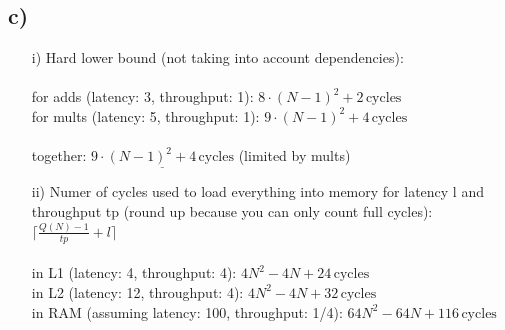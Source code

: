 \documentclass[11pt]{article}
\newcommand{\unit}[1]{\ensuremath{\, \mathrm{#1}}}			%
\begin{document}
		\subsection*{c)}
			\begin{itemize}
				\item[i)] Hard lower bound (not taking into account dependencies): \\\\
				for adds (latency: 3, throughput: 1): $8 \cdot (N-1)^2 + 2 \unit{cycles}$\\
				for mults (latency: 5, throughput: 1): $9 \cdot (N-1)^2 + 4 \unit{cycles}$ \\\\
				together: $\underline{9 \cdot (N-1)^2 + 4 \unit{cycles}}$ (limited by mults)
				\item[ii)] Numer of cycles used to load everything into memory for latency l and throughput tp (round up because you can only count full cycles):
				$\lceil \frac{Q(N) - 1}{tp} + l \rceil$\\\\
				in L1 (latency: 4, throughput: 4): $4 N^2 - 4 N + 24 \unit{cycles}$\\
				in L2 (latency: 12, throughput: 4): $4 N^2 - 4 N + 32 \unit{cycles}$\\
				in RAM (assuming latency: 100, throughput: 1/4): $64 N^2 - 64 N + 116 \unit{cycles}$
			\end{itemize}
\end{document}

